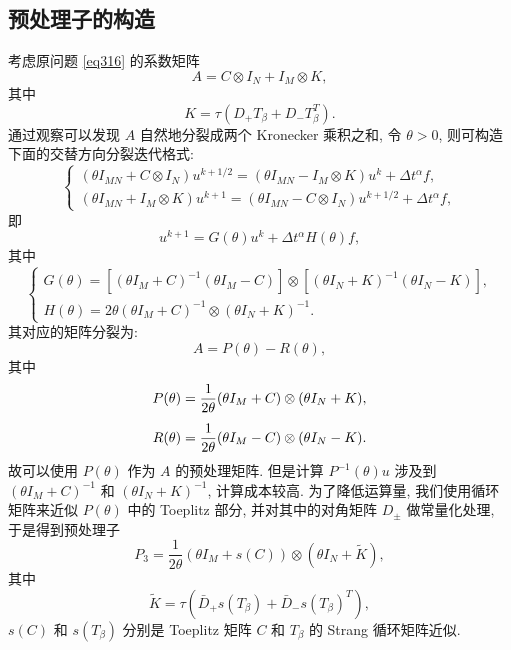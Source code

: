 \documentclass{ecnumaster}
\newcommand{\beq}{\begin{equation}}
\newcommand{\eeq}{\end{equation}}
\begin{document}
\subsection{预处理子的构造}
考虑原问题 \eqref{eq316} 的系数矩阵
$$
  A = C \otimes I_N + I_M \otimes K,
$$
其中
$$
  K = \tau (D_+ T_{\beta} + D_- T_{\beta}^T).
$$
%
通过观察可以发现 $A$ 自然地分裂成两个 Kronecker 乘积之和,
%
令 $\theta > 0$, 则可构造下面的交替方向分裂迭代格式:
$$
  \begin{cases}
    (\theta I_{MN} + C\otimes I_N) u^{k+1/2}
      = (\theta I_{MN} - I_M \otimes K) u^{k} + \Delta t^\alpha f, \\
    (\theta I_{MN} + I_M\otimes K) u^{k+1}
      =  (\theta I_{MN} - C\otimes I_N) u^{k+1/2} + \Delta t^\alpha f,
  \end{cases}
$$
即
\beq\label{eq:adi}
  u^{k+1} = G(\theta) u^k + \Delta t^\alpha H(\theta) f,
\eeq
其中
\begin{equation}\label{eq467}
  \begin{cases}
    G(\theta)
    = [(\theta I_M + C)^{-1} (\theta I_M - C)] \otimes [(\theta I_N + K)^{-1} (\theta I_N - K)],\\
    H(\theta)
    = 2 \theta (\theta I_M + C)^{-1} \otimes (\theta I_N + K)^{-1}.
  \end{cases}
\end{equation}
其对应的矩阵分裂为:
$$
  A = P(\theta) - R(\theta),
$$
其中
\begin{align}\label{eq:P-theta}
    P(\theta) &= \frac{1}{2 \theta} (\theta I_M + C) \otimes (\theta I_N + K),\\[1ex]
    R(\theta) &= \frac{1}{2 \theta} (\theta I_M - C) \otimes (\theta I_N - K).\notag
\end{align}
故可以使用 $P(\theta)$ 作为 $A$ 的预处理矩阵.
但是计算 $P^{-1}(\theta) u$ 涉及到
$(\theta I_M + C)^{-1}$ 和 $(\theta I_N + K)^{-1}$,
计算成本较高.
为了降低运算量, 我们使用循环矩阵来近似 $P(\theta)$ 中的 Toeplitz 部分,
并对其中的对角矩阵 $D_\pm$ 做常量化处理, 于是得到预处理子
\beq\label{eq:P3}
  P_3 = \frac{1}{2\theta} (\theta I_M + s(C)) \otimes (\theta I_N + \tilde{K}),
\eeq
其中
$$
   \tilde{K} = \tau\left(\bar{D}_+ s(T_{\beta}) + \bar{D}_- s(T_{\beta})^T\right),
$$
$s(C)$ 和 $s(T_{\beta})$ 分别是 Toeplitz 矩阵 $C$ 和 $T_{\beta}$ 的 Strang 循环矩阵近似.
\end{document}
